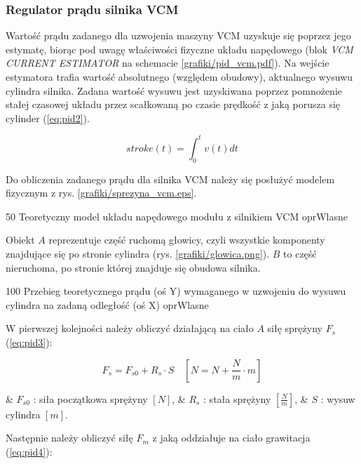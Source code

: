 \subsubsection{Regulator prądu silnika VCM}

Wartość prądu zadanego dla uzwojenia maszyny VCM uzyskuje się poprzez jego estymatę, biorąc pod uwagę właściwości fizyczne układu napędowego (blok {\it VCM CURRENT ESTIMATOR} na schemacie \ref{grafiki/pid_vcm.pdf}). Na wejście estymatora trafia wartość absolutnego (względem obudowy), aktualnego wysuwu cylindra silnika. Zadana wartość wysuwu jest uzyskiwana poprzez pomnożenie stałej czasowej układu przez scałkowaną po czasie prędkość z jaką porusza się cylinder (\ref{eq:pid2}).

\begin{equation} \label{eq:pid2}
	stroke(t) = \int_0^t v(t) dt
\end{equation}

Do obliczenia zadanego prądu dla silnika VCM należy się posłużyć modelem fizycznym z rys. \ref{grafiki/sprezyna_vcm.eps}.

	{50}
	{Teoretyczny model układu napędowego modułu z silnikiem VCM}
	{oprWlasne}
	
Obiekt $ A $ reprezentuje część ruchomą głowicy, czyli wszystkie komponenty znajdujące się po stronie cylindra (rys. \ref{grafiki/glowica.png}). $ B $ to część nieruchoma, po stronie której znajduje się obudowa silnika. 

	{100}
	{Przebieg teoretycznego prądu (oś Y) wymaganego w uzwojeniu do wysuwu cylindra na zadaną odległość (oś X)}
	{oprWlasne}

W pierwszej kolejności należy obliczyć działającą na ciało $ A $ siłę sprężyny $ F_s $ (\ref{eq:pid3}):

\begin{equation} \label{eq:pid3}
	F_s = F_{s0} + R_s \cdot S \quad [ N = N + \frac{N}{m} \cdot m ]
\end{equation}

\begin{easylist}
	& $ F_{s0} $ : siła początkowa sprężyny $ [N] $,
	& $ R_s $ : stała sprężyny $ [\frac{N}{m}] $,
	& $ S $ : wysuw cylindra $ [m] $.
	\\
\end{easylist} 

Następnie należy obliczyć siłę $ F_m $ z jaką oddziałuje na ciało grawitacja (\ref{eq:pid4}):

